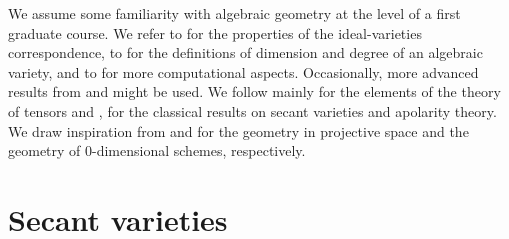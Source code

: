 We assume some familiarity with algebraic geometry at the level of a first graduate course. We refer to \cite{Sha94} for the properties of the ideal-varieties correspondence, to \cite{Har92} for the definitions of dimension and degree of an algebraic variety, and to \cite{CLO07} for more computational aspects. Occasionally, more advanced results from \cite{Mum76} and \cite{Vak24} might be used. We follow mainly \cite{Lan12} for the elements of the theory of tensors and \cite{BCCGO18}, \cite{CGO14} for the classical results on secant varieties and apolarity theory. We draw inspiration from \cite{Rus16} and \cite{IK99} for the geometry in projective space and the geometry of $0$-dimensional schemes, respectively.

\chapter{Secant varieties}
\label{geometrySecants-chapter-SecantVarieties}



% 
% 
% 
% 
% 


% 

